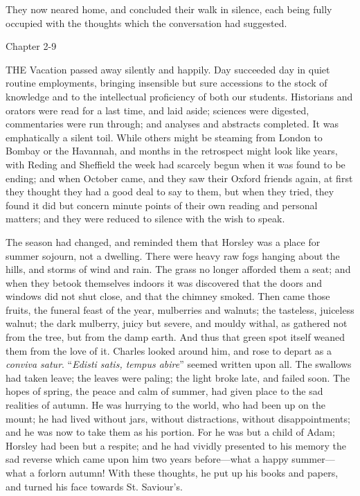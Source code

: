 They now neared home, and concluded their walk in silence, each
being fully occupied with the thoughts which the conversation had
suggested.

Chapter 2-9


THE Vacation passed away silently and
happily. Day succeeded day in quiet routine employments, bringing
insensible but sure accessions to the stock of knowledge and to the
intellectual proficiency of both our students. Historians and orators
were read for a last time, and laid aside; sciences were digested,
commentaries were run through; and analyses and abstracts completed.
It was emphatically a silent toil. While others might be steaming from
London to Bombay or the Havannah, and months in the retrospect might
look like years, with Reding and Sheffield the week had scarcely begun
when it was found to be ending; and when October came, and they saw
their Oxford friends again, at first they thought they had a good deal
to say to them, but when they tried, they found it did but concern
minute points of their own reading and personal matters; and they were
reduced to silence with the wish to speak.

The season had changed, and reminded them that Horsley was a place
for summer sojourn, not a dwelling. There were heavy raw fogs hanging
about the hills, and storms of wind and rain. The grass no longer
afforded them a seat; and when they betook themselves indoors it
was discovered that the doors and windows did not shut close, and that
the chimney smoked. Then came those fruits, the funeral feast of the
year, mulberries and walnuts; the tasteless, juiceless walnut; the
dark mulberry, juicy but severe, and mouldy withal, as gathered not
from the tree, but from the damp earth. And thus that green spot
itself weaned them from the love of it. Charles looked around him, and
rose to depart as a \emph{conviva satur}. ``\emph{Edisti satis,
tempus abire}'' seemed written upon all. The swallows had taken
leave; the leaves were paling; the light broke late, and failed soon.
The hopes of spring, the peace and calm of summer, had given place to
the sad realities of autumn. He was hurrying to the world, who had
been up on the mount; he had lived without jars, without distractions,
without disappointments; and he was now to take them as his portion.
For he was but a child of Adam; Horsley had been but a respite; and he
had vividly presented to his memory the sad reverse which came upon
him two years before—what a happy summer—what a forlorn autumn!
With these thoughts, he put up his books and papers, and turned his
face towards St. Saviour's.

